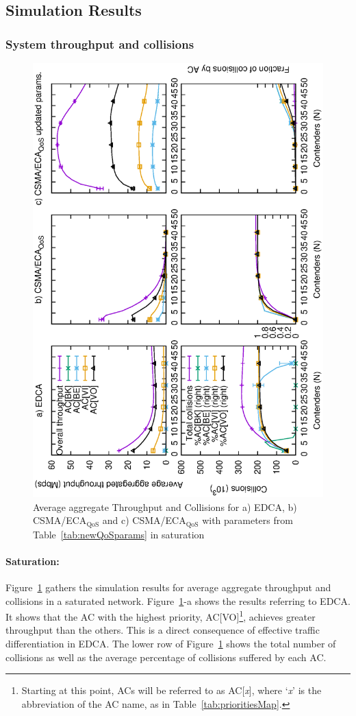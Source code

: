 \subsection{Simulation Results}\label{sim:results}
\subsubsection{System throughput and collisions}

\begin{figure}[t]
	\centering
		\includegraphics[width=0.7\linewidth,angle = -90]{figures/multiplot-sat-perfect.eps}
		\caption{Average aggregate Throughput and Collisions for a) EDCA, b) CSMA/ECA$_{\text{QoS}}$ and c) CSMA/ECA$_{\text{QoS}}$ with parameters from Table~\ref{tab:newQoSparams} in saturation}
		\label{fig:multiplotSat}
\end{figure}

\paragraph{Saturation:} Figure~\ref{fig:multiplotSat} gathers the simulation results for average aggregate throughput and collisions in a saturated network. Figure~\ref{fig:multiplotSat}-a shows the results referring to EDCA. It shows that the AC with the highest priority, AC[VO]\footnote{Starting at this point, ACs will be referred to as AC[\emph{x}], where `\emph{x}' is the abbreviation of the AC name, as in Table~\ref{tab:prioritiesMap}.}, achieves greater throughput than the others. This is a direct consequence of effective traffic differentiation in EDCA. The lower row of Figure~\ref{fig:multiplotSat} shows the total number of collisions as well as the average percentage of collisions suffered by each AC. 

